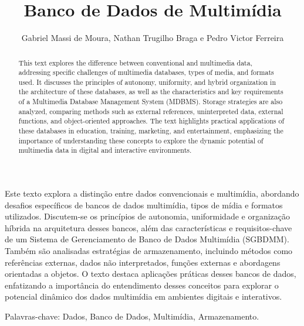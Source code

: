 \documentclass[12pt]{article}
\title{Banco de Dados de Multimídia}
\author{Gabriel Massi de Moura\inst{1}, Nathan Trugilho Braga\inst{1} e Pedro Victor Ferreira\inst{1}}
\begin{document}
 
	
	\begin{titlepage}
		
		\maketitle
		
	\end{titlepage}
	
	\begin{abstract}
		This text explores the difference between conventional and multimedia data, addressing specific challenges of multimedia databases, types of media, and formats used. It discusses the principles of autonomy, uniformity, and hybrid organization in the architecture of these databases, as well as the characteristics and key requirements of a Multimedia Database Management System (MDBMS). Storage strategies are also analyzed, comparing methods such as external references, uninterpreted data, external functions, and object-oriented approaches. The text highlights practical applications of these databases in education, training, marketing, and entertainment, emphasizing the importance of understanding these concepts to explore the dynamic potential of multimedia data in digital and interactive environments.
	\end{abstract}
	
	\begin{resumo} 
		Este texto explora a distinção entre dados convencionais e multimídia, abordando desafios específicos de bancos de dados multimídia, tipos de mídia e formatos utilizados. Discutem-se os princípios de autonomia, uniformidade e organização híbrida na arquitetura desses bancos, além das características e requisitos-chave de um Sistema de Gerenciamento de Banco de Dados Multimídia (SGBDMM). Também são analisadas estratégias de armazenamento, incluindo métodos como referências externas, dados não interpretados, funções externas e abordagens orientadas a objetos. O texto destaca aplicações práticas desses bancos de dados, enfatizando a importância do entendimento desses conceitos para explorar o potencial dinâmico dos dados multimídia em ambientes digitais e interativos.
	\end{resumo}
	
	Palavras-chave: Dados, Banco de Dados, Multimídia, Armazenamento.
	
	
	\newpage
	
	\tableofcontents
	
	\newpage
	
\end{document}
